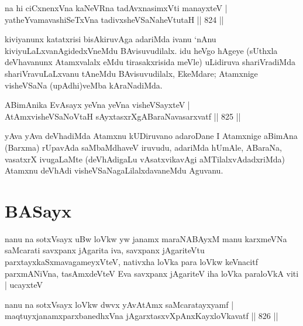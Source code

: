 
\begin{shl}
na hi ciCxnenxVna kaNeVRna tadAvxnasimxVti manayxteV | \\
yatheYvamavashiSeTxVna tadivxsheVSaNaheVtutaH \hfill||  824 ||  
\end{shl}

\begin{artha}
kiviyanunx katatxrisi bisAkiruvAga adariMda ivanu `nAnu kiviyuLaLxvanAgidedxVneMdu BAvisuvudilalx. idu heVgo hAgeye (sUthxla deVhavanunx Atamxvalalx eMdu tirasakxrisida meVle) uLidiruva shariVradiMda shariVravuLaLxvanu tAneMdu BAvisuvudilalx, EkeMdare; Atamxnige visheVSaNa (upAdhi)veMba kAraNadiMda.
\end{artha}


\begin{shl}
ABimAnika EvAsayx yeVna yeVna visheVSayxteV | \\
AtAmx\s visheVSaNoV\s taH sAyxtasxrXgABaraNavasarxvatf \hfill||  825 ||  
\end{shl}

\begin{artha}
yAva yAva deVhadiMda Atamxnu kUDiruvano adaroDane I Atamxnige aBimAna (Barxma) rUpavAda saMbaMdhaveV iruvudu, adariMda hUmAle, ABaraNa, vasatxrX ivugaLaMte (deVhAdigaLu vAsatxvikavAgi aMTilalxvAdadxriMda) Atamxnu deVhAdi visheVSaNagaLilalxdavaneMdu Aguvanu.
\end{artha}

\section*{BASayx}

\begin{shl}
nanu na sotxV\s sayx uBw loVkw yw janamx maraNABAyxM manu karxmeVNa saMcarati savxpanx jAgarita iva, savxpanx jAgariteVtu parxtayxkaSxmavagameyxVteV, nativxha loVka para loVkw keVnacitf parxmANiVna, tasAmxdeVteV Eva savxpanx jAgariteV iha loVka paraloVkA viti | ucayxteV
\end{shl}


\begin{shl}
nanu na sotxV\s sayx loVkw dwvx yAvAtAmx saMcaratayxyamf | \\
maqtuyxjanamxparxbanedhxVna jAgarxtasxvXpAnxKayxloVkavatf \hfill||  826 ||  
\end{shl}

